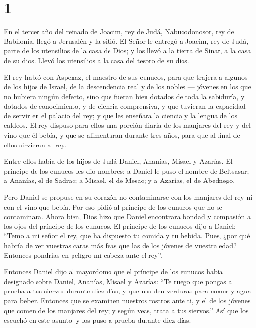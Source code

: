 \hypertarget{section}{%
\section{1}\label{section}}

 En el tercer año del reinado de Joacim, rey de Judá,
Nabucodonosor, rey de Babilonia, llegó a Jerusalén y la sitió.
 El Señor le entregó a Joacim, rey de Judá, parte de los
utensilios de la casa de Dios; y los llevó a la tierra de Sinar, a la
casa de su dios. Llevó los utensilios a la casa del tesoro de su dios.

 El rey habló con Aspenaz, el maestro de sus eunucos, para
que trajera a algunos de los hijos de Israel, de la descendencia real y
de los nobles ---  jóvenes en los que no hubiera ningún
defecto, sino que fueran bien dotados de toda la sabiduría, y dotados de
conocimiento, y de ciencia comprensiva, y que tuvieran la capacidad de
servir en el palacio del rey; y que les enseñara la ciencia y la lengua
de los caldeos.  El rey dispuso para ellos una porción
diaria de los manjares del rey y del vino que él bebía, y que se
alimentaran durante tres años, para que al final de ellos sirvieran al
rey.

 Entre ellos había de los hijos de Judá Daniel, Ananías,
Misael y Azarías.  El príncipe de los eunucos les dio
nombres: a Daniel le puso el nombre de Beltsasar; a Ananías, el de
Sadrac; a Misael, el de Mesac; y a Azarías, el de Abednego.

 Pero Daniel se propuso en su corazón no contaminarse con
los manjares del rey ni con el vino que bebía. Por eso pidió al príncipe
de los eunucos que no se contaminara.  Ahora bien, Dios
hizo que Daniel encontrara bondad y compasión a los ojos del príncipe de
los eunucos.  El príncipe de los eunucos dijo a Daniel:
``Temo a mi señor el rey, que ha dispuesto tu comida y tu bebida. Pues,
¿por qué habría de ver vuestras caras más feas que las de los jóvenes de
vuestra edad? Entonces pondrías en peligro mi cabeza ante el rey''.

 Entonces Daniel dijo al mayordomo que el príncipe de los
eunucos había designado sobre Daniel, Ananías, Misael y Azarías:
 ``Te ruego que pongas a prueba a tus siervos durante
diez días, y que nos den verduras para comer y agua para beber.
 Entonces que se examinen nuestros rostros ante ti, y el
de los jóvenes que comen de los manjares del rey; y según veas, trata a
tus siervos.''  Así que los escuchó en este asunto, y los
puso a prueba durante diez días.

